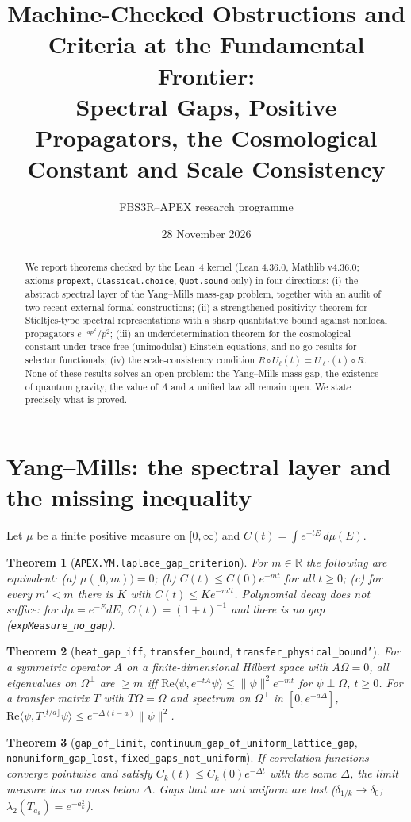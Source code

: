 \documentclass[11pt]{article}
\title{Machine-Checked Obstructions and Criteria at the Fundamental Frontier:\\ Spectral Gaps, Positive Propagators, the Cosmological Constant and Scale Consistency}
\author{FBS3R--APEX research programme}
\date{28 November 2026}
\newtheorem{theorem}{Theorem}
\theoremstyle{remark}\newtheorem{remark}[theorem]{Remark}
\begin{document}
\maketitle
\begin{abstract}
We report theorems checked by the Lean~4 kernel (Lean 4.36.0, Mathlib v4.36.0; axioms \texttt{propext}, \texttt{Classical.choice}, \texttt{Quot.sound} only) in four directions:
(i) the abstract spectral layer of the Yang--Mills mass-gap problem, together with an audit of two recent external formal constructions;
(ii) a strengthened positivity theorem for Stieltjes-type spectral representations with a sharp quantitative bound against nonlocal propagators $e^{-ap^2}/p^2$;
(iii) an underdetermination theorem for the cosmological constant under trace-free (unimodular) Einstein equations, and no-go results for selector functionals;
(iv) the scale-consistency condition $R\circ U_\ell(t)=U_{\ell'}(t)\circ R$.
None of these results solves an open problem: the Yang--Mills mass gap, the existence of quantum gravity, the value of $\Lambda$ and a unified law all remain open. We state precisely what is proved.
\end{abstract}

\section{Yang--Mills: the spectral layer and the missing inequality}
Let $\mu$ be a finite positive measure on $[0,\infty)$ and $C(t)=\int e^{-tE}\,d\mu(E)$.
\begin{theorem}[\texttt{APEX.YM.laplace\_gap\_criterion}]
For $m\in\mathbb R$ the following are equivalent: (a) $\mu([0,m))=0$; (b) $C(t)\le C(0)e^{-mt}$ for all $t\ge0$; (c) for every $m'<m$ there is $K$ with $C(t)\le Ke^{-m't}$.
Polynomial decay does not suffice: for $d\mu=e^{-E}dE$, $C(t)=(1+t)^{-1}$ and there is no gap (\texttt{expMeasure\_no\_gap}).
\end{theorem}
\begin{theorem}[\texttt{heat\_gap\_iff}, \texttt{transfer\_bound}, \texttt{transfer\_physical\_bound'}]
For a symmetric operator $A$ on a finite-dimensional Hilbert space with $A\Omega=0$, all eigenvalues on $\Omega^\perp$ are $\ge m$ iff $\mathrm{Re}\langle\psi,e^{-tA}\psi\rangle\le\|\psi\|^2e^{-mt}$ for $\psi\perp\Omega$, $t\ge0$. For a transfer matrix $T$ with $T\Omega=\Omega$ and spectrum on $\Omega^\perp$ in $[0,e^{-a\Delta}]$, $\mathrm{Re}\langle\psi,T^{\lfloor t/a\rfloor}\psi\rangle\le e^{-\Delta(t-a)}\|\psi\|^2$.
\end{theorem}
\begin{theorem}[\texttt{gap\_of\_limit}, \texttt{continuum\_gap\_of\_uniform\_lattice\_gap}, \texttt{nonuniform\_gap\_lost}, \texttt{fixed\_gaps\_not\_uniform}]
If correlation functions converge pointwise and satisfy $C_k(t)\le C_k(0)e^{-\Delta t}$ with the \emph{same} $\Delta$, the limit measure has no mass below $\Delta$. Gaps that are not uniform are lost ($\delta_{1/k}\to\delta_0$; $\lambda_2(T_{a_k})=e^{-a_k^2}$).
\end{theorem}
\end{document}
